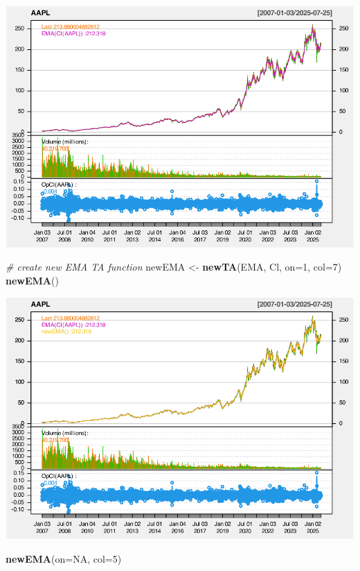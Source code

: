 \documentclass[]{ctexbook}
\newenvironment{Shaded}{\begin{snugshade}}{\end{snugshade}}
\newcommand{\AttributeTok}[1]{\textcolor[rgb]{0.13,0.29,0.53}{#1}}
\newcommand{\CommentTok}[1]{\textcolor[rgb]{0.56,0.35,0.01}{\textit{#1}}}
\newcommand{\ConstantTok}[1]{\textcolor[rgb]{0.56,0.35,0.01}{#1}}
\newcommand{\DecValTok}[1]{\textcolor[rgb]{0.00,0.00,0.81}{#1}}
\newcommand{\FunctionTok}[1]{\textcolor[rgb]{0.13,0.29,0.53}{\textbf{#1}}}
\newcommand{\NormalTok}[1]{#1}
\newcommand{\OtherTok}[1]{\textcolor[rgb]{0.56,0.35,0.01}{#1}}
\begin{document}
\includegraphics[width=0.9\linewidth]{QuantmodHandbook_files/figure-latex/newta-3}

\begin{Shaded}
\begin{Highlighting}[]
\CommentTok{\# create new EMA TA function}
\NormalTok{newEMA }\OtherTok{\textless{}{-}} \FunctionTok{newTA}\NormalTok{(EMA, Cl, }\AttributeTok{on=}\DecValTok{1}\NormalTok{, }\AttributeTok{col=}\DecValTok{7}\NormalTok{)}
\FunctionTok{newEMA}\NormalTok{()}
\end{Highlighting}
\end{Shaded}

\includegraphics[width=0.9\linewidth]{QuantmodHandbook_files/figure-latex/newta-4}

\begin{Shaded}
\begin{Highlighting}[]
\FunctionTok{newEMA}\NormalTok{(}\AttributeTok{on=}\ConstantTok{NA}\NormalTok{, }\AttributeTok{col=}\DecValTok{5}\NormalTok{)}
\end{Highlighting}
\end{Shaded}
\end{document}

